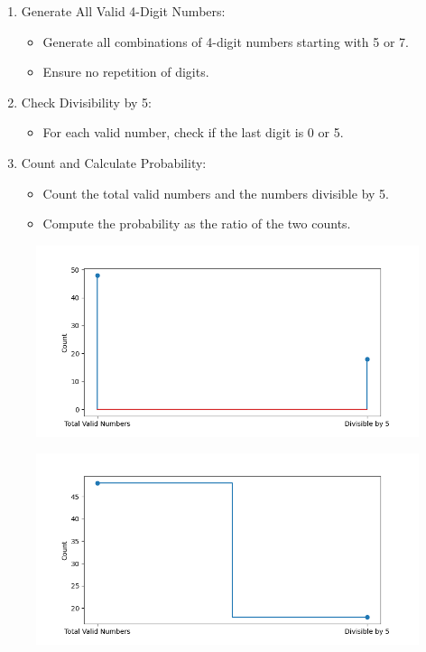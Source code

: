 \documentclass[journal]{IEEEtran}
\begin{document}
\begin{enumerate}

\item Generate All Valid 4-Digit Numbers:
    \begin{itemize}
   \item Generate all combinations of 4-digit numbers starting with 5 or 7.
   \item Ensure no repetition of digits.
    \end{itemize}

\item Check Divisibility by 5:
    \begin{itemize}
    \item For each valid number, check if the last digit is 0 or 5.
    \end{itemize}
\item Count and Calculate Probability:
    \begin{itemize}
   \item Count the total valid numbers and the numbers divisible by 5.
   \item Compute the probability as the ratio of the two counts.
    \end{itemize}     
\end{enumerate}

\begin{figure}[h!]
   \centering
   \includegraphics[width=0.6\columnwidth]{figs/fig1.png}
\end{figure}

\begin{figure}[h!]
   \centering
   \includegraphics[width=0.6\columnwidth]{figs/fig2.png}
\end{figure}
\end{document}
